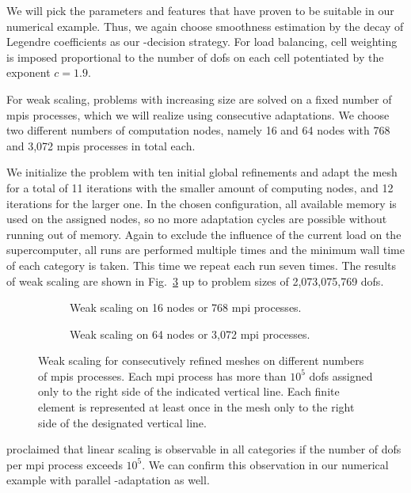 We will pick the parameters and features that have proven to be suitable in our numerical example. Thus, we again choose smoothness estimation by the decay of Legendre coefficients as our \hp-decision strategy. For load balancing, cell weighting is imposed proportional to the number of \glspl{dof} on each cell potentiated by the exponent $c = 1.9$.



For weak scaling, problems with increasing size are solved on a fixed number of \glspl{mpi} processes, which we will realize using consecutive adaptations. We choose two different numbers of computation nodes, namely 16 and 64 nodes with 768 and 3,072 \glspl{mpi} processes in total each.

We initialize the problem with ten initial global refinements and adapt the mesh for a total of 11 iterations with the smaller amount of computing nodes, and 12 iterations for the larger one. In the chosen configuration, all available memory is used on the assigned nodes, so no more adaptation cycles are possible without running out of memory. Again to exclude the influence of the current load on the supercomputer, all runs are performed multiple times and the minimum wall time of each category is taken. This time we repeat each run seven times. The results of weak scaling are shown in Fig.~\ref{fig:weak} up to problem sizes of 2,073,075,769 \glspl{dof}.

\begin{figure}
\begin{subfigure}{1\textwidth}
  \centering
  \caption{Weak scaling on 16 nodes or 768 \gls{mpi} processes.}
  \label{fig:weak-nodes16}
\end{subfigure}
\begin{subfigure}{1\textwidth}
  \centering
  \caption{Weak scaling on 64 nodes or 3,072 \gls{mpi} processes.}
  \label{fig:weak-nodes64}
\end{subfigure}
\caption{Weak scaling for consecutively refined meshes on different numbers of \glspl{mpi} processes. Each \gls{mpi} process has more than $10^5$ \glspl{dof} assigned only to the right side of the indicated vertical line. Each finite element is represented at least once in the mesh only to the right side of the designated vertical line.}
\label{fig:weak}
\end{figure}

\textcite{bangerth2012} proclaimed that linear scaling is observable in all categories if the number of \glspl{dof} per \gls{mpi} process exceeds $10^5$. We can confirm this observation in our numerical example with parallel \hp-adaptation as well.

